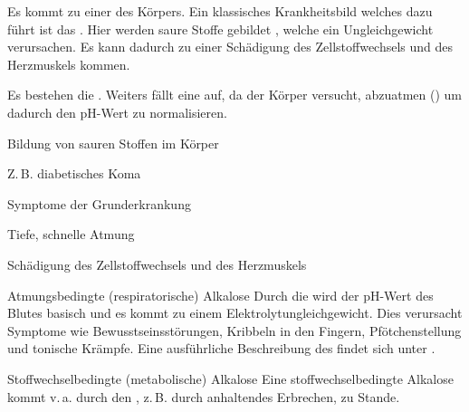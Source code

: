 {%
\label{topic:azidose-metabolische}
Es kommt zu einer  des
Körpers.
Ein klassisches Krankheitsbild welches dazu führt  ist das
. Hier werden saure
Stoffe gebildet , welche ein
Ungleichgewicht verursachen. Es kann dadurch zu einer
Schädigung des Zellstoffwechsels und des Herzmuskels kommen.

Es bestehen die . Weiters
fällt eine  auf, da der Körper
versucht,  abzuatmen () um
dadurch den pH-Wert zu normalisieren.



}{%
\begin{compactitem}
  \item Bildung von sauren Stoffen im Körper
  
  Z.\,B. diabetisches Koma
  \item Symptome der Grunderkrankung
  \item Tiefe, schnelle Atmung
  \item Schädigung des Zellstoffwechsels und des
  Herzmuskels
\end{compactitem}
}{}{}{}


\Text
{Atmungsbedingte (respiratorische) Alkalose}
{\label{topic:alkalose-respiratorische}
Durch die  wird der
pH-Wert des Blutes basisch und es kommt zu einem
Elektrolytungleichgewicht. Dies verursacht Symptome wie
Bewusstseinsstörungen, Kribbeln in den Fingern,
Pfötchenstellung und tonische Krämpfe.
Eine ausführliche Beschreibung des
 findet sich unter
.}
{}
{}
{}
{}

\Text
{Stoffwechselbedingte (metabolische) Alkalose}
{\label{topic:alkalose-metabolische}
Eine stoffwechselbedingte Alkalose  kommt v.\,a. durch den
, z.\,B. durch anhaltendes Erbrechen,
zu Stande.}
{}
{}
{}
{}


\subsubsection*{}

